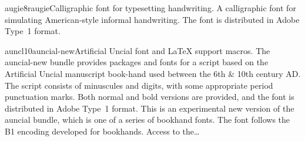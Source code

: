 \documentclass{ddltxtyp}
\begin{document}

\begin{package}{augie8r}{augie}{Calligraphic font for typesetting handwriting.}
A calligraphic font for simulating American-style informal
handwriting. The font is distributed in Adobe Type~1 format.
\end{package}

\begin{package}{auncl10}{auncial-new}{Artificial Uncial font and {\LaTeX} support macros.}
The auncial-new bundle provides packages and fonts for a script
based on the Artificial Uncial manuscript book-hand used
between the 6th \& 10th century AD. The script consists of
minuscules and digits, with some appropriate period punctuation
marks. Both normal and bold versions are provided, and the font
is distributed in Adobe Type~1 format. This is an experimental
new version of the auncial bundle, which is one of a series of
bookhand fonts. The font follows the B1 encoding developed for
bookhands. Access to the\ldots%
\end{package}
\end{document}
